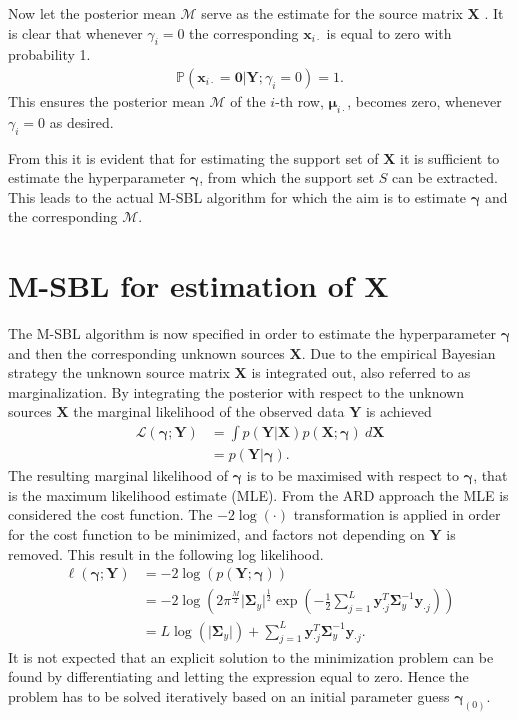 Now let the posterior mean $\mathcal{M}$ serve as the estimate for the source matrix $\mathbf{X}$ \cite[p. 147]{phd_wipf}.
It is clear that whenever $\gamma_i = 0$ the corresponding $\textbf{x}_{i\cdot}$ is equal to zero with probability 1.
\begin{align*}
\mathbb{P}(\mathbf{x}_{i \cdot} = \mathbf{0} \vert \mathbf{Y} ; \gamma_i = 0) = 1.
\end{align*}
This ensures the posterior mean $\mathcal{M}$ of the $i$-th row, $\boldsymbol{\mu}_{i \cdot}$, becomes zero, whenever $\gamma_i = 0$ as desired.

From this it is evident that for estimating the support set of $\mathbf{X}$ it is sufficient to estimate the hyperparameter $\boldsymbol{\gamma}$, from which the support set $S$ can be extracted.  
This leads to the actual M-SBL algorithm for which the aim is to estimate $\boldsymbol{\gamma}$ and the corresponding $\mathcal{M}$.

\section{M-SBL for estimation of $\textbf{X}$}\label{seg:M_sblalg}
The M-SBL algorithm is now specified in order to estimate the hyperparameter $\boldsymbol{\gamma}$ and then the corresponding unknown sources $\textbf{X}$.
Due to the empirical Bayesian strategy the unknown source matrix $\mathbf{X}$ is integrated out, also referred to as marginalization.
By integrating the posterior with respect to the unknown sources $\mathbf{X}$ the marginal likelihood of the observed data $\mathbf{Y}$ is achieved \cite[p. 146]{phd_wipf} 
\begin{align*}
\mathcal{L}(\boldsymbol{\gamma};\textbf{Y}) &= \int p (\mathbf{Y} \vert \mathbf{X}) p (\mathbf{X} ; \boldsymbol{\gamma}) \ d\mathbf{X} \\
&= p (\mathbf{Y} \vert \boldsymbol{\gamma}).
\end{align*}
The resulting marginal likelihood of $\boldsymbol{\gamma}$ is to be maximised with respect to $\boldsymbol{\gamma}$, that is the maximum likelihood estimate (MLE). From the ARD approach the MLE is considered the cost function. 
The $-2 \log (\cdot)$ transformation is applied in order for the cost function to be minimized, and factors not depending on $\textbf{Y}$ is removed. This result in the following log likelihood. 
\begin{align}
\ell(\boldsymbol{\gamma};\textbf{Y})&= - 2 \log(p (\mathbf{Y} ; \boldsymbol{\gamma}))\nonumber \\ 
&= -2\log \left( 2\pi^{\frac{M}{2}}\vert \boldsymbol{\Sigma}_{y}\vert^{\frac{1}{2}}\exp \left( - \frac{1}{2} \sum_{j=1}^L \textbf{y}_{\cdot j}^T \boldsymbol{\Sigma}_{y}^{-1} \textbf{y}_{\cdot j} \right) \right)\nonumber \\
&= L \log ( \vert \boldsymbol{\Sigma}_y \vert ) + \sum_{j=1}^L \mathbf{y}_{\cdot j}^T \boldsymbol{\Sigma}_y ^{-1} \mathbf{y}_{\cdot j}.\label{eq:likelihood}
\end{align}
It is not expected that an explicit solution to the minimization problem can be found by differentiating and letting the expression equal to zero. Hence the problem has to be solved iteratively based on an initial parameter guess $\boldsymbol{\gamma}_{(0)}$.

